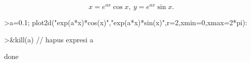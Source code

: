\documentclass[a4paper,10pt]{article}
\begin{document}
\begin{eulernotebook}
\begin{eulercomment}
\begin{eulercomment}
\begin{eulercomment}
\begin{eulercomment}
\begin{eulercomment}
\end{eulercomment}
\begin{eulerformula}
\[
x=e^{ax}\cos x,\ y=e^{ax}\sin x.
\]
\end{eulerformula}
\begin{eulerprompt}
>a=0.1; plot2d("exp(a*x)*cos(x)","exp(a*x)*sin(x)",r=2,xmin=0,xmax=2*pi):
\end{eulerprompt}
\begin{eulerprompt}
>&kill(a) // hapus expresi a
\end{eulerprompt}
\begin{euleroutput}
  
                                   done
  
\end{euleroutput}
\begin{eulerformula}
\[
\]
\end{eulerformula}
\end{eulercomment}
\end{eulercomment}
\end{eulercomment}
\end{eulercomment}
\end{eulernotebook}
\end{document}
